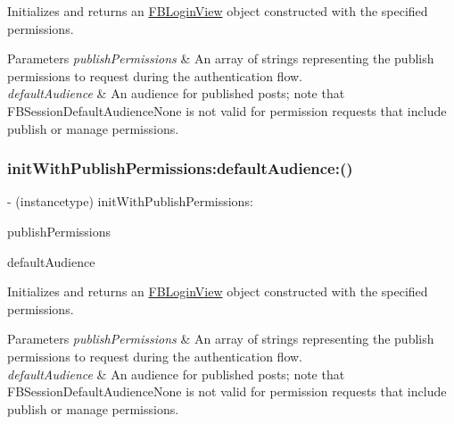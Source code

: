 Initializes and returns an {\ttfamily \hyperlink{interfaceFBLoginView}{F\+B\+Login\+View}} object constructed with the specified permissions.


\begin{DoxyParams}{Parameters}
{\em publish\+Permissions} & An array of strings representing the publish permissions to request during the authentication flow.\\
\hline
{\em default\+Audience} & An audience for published posts; note that F\+B\+Session\+Default\+Audience\+None is not valid for permission requests that include publish or manage permissions. \\
\hline
\end{DoxyParams}
\mbox{\label{interfaceFBLoginView_a937f55736400541dc0f21fe01d6a8b96}} 
\subsubsection{\texorpdfstring{init\+With\+Publish\+Permissions\+:default\+Audience\+:()}{initWithPublishPermissions:defaultAudience:()}\hspace{0.1cm}{\footnotesize\ttfamily [4/5]}}
{\footnotesize\ttfamily -\/ (instancetype) init\+With\+Publish\+Permissions\+: \begin{DoxyParamCaption}\item[{(N\+S\+Array $\ast$)}]{publish\+Permissions }\item[{defaultAudience:(F\+B\+Session\+Default\+Audience)}]{default\+Audience }\end{DoxyParamCaption}}

Initializes and returns an {\ttfamily \hyperlink{interfaceFBLoginView}{F\+B\+Login\+View}} object constructed with the specified permissions.


\begin{DoxyParams}{Parameters}
{\em publish\+Permissions} & An array of strings representing the publish permissions to request during the authentication flow.\\
\hline
{\em default\+Audience} & An audience for published posts; note that F\+B\+Session\+Default\+Audience\+None is not valid for permission requests that include publish or manage permissions. \\
\hline
\end{DoxyParams}
\mbox{\label{interfaceFBLoginView_a937f55736400541dc0f21fe01d6a8b96}} 
